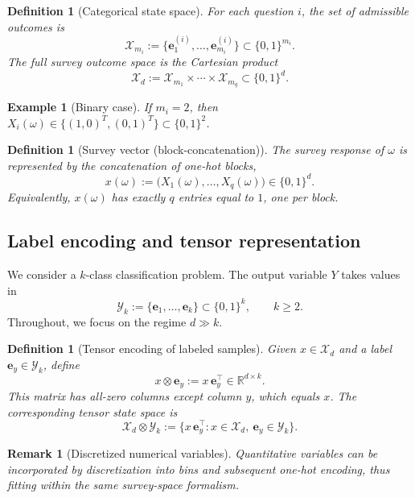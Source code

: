 \documentclass[preprint,11pt]{elsarticle}
\newtheorem{Definition}[Theorem]{Definition}
\newtheorem{Remark}[Theorem]{Remark}
\newtheorem{Example}[Theorem]{Example}
\newcommand{\R}{\mathbb{R}}
\begin{document}
\begin{Definition}[Categorical state space]
For each question $i$, the set of admissible outcomes is
\[
\mathcal X_{m_i}:=\{\mathbf e_1^{(i)},\dots,\mathbf e_{m_i}^{(i)}\}\subset\{0,1\}^{m_i}.
\]
The full survey outcome space is the Cartesian product
\[
\mathcal X_d := \mathcal X_{m_1}\times\cdots\times \mathcal X_{m_q}\subset\{0,1\}^d.
\]
\end{Definition}

\begin{Example}[Binary case]
If $m_i=2$, then $X_i(\omega)\in\{(1,0)^T,(0,1)^T\}\subset\{0,1\}^2$.
\end{Example}

\begin{Definition}[Survey vector (block-concatenation)]
The survey response of $\omega$ is represented by the concatenation of one-hot blocks,
\[
x(\omega):=\bigl(X_1(\omega),\dots,X_q(\omega)\bigr)\in\{0,1\}^d.
\]
Equivalently, $x(\omega)$ has exactly $q$ entries equal to $1$, one per block.
\end{Definition}


\subsection{Label encoding and tensor representation}
We consider a $k$-class classification problem. The output variable $Y$ takes values in
\[
\mathcal Y_k:=\{\mathbf e_1,\dots,\mathbf e_k\}\subset\{0,1\}^k,\qquad k\ge 2.
\]
Throughout, we focus on the regime $d\gg k$.

\begin{Definition}[Tensor encoding of labeled samples]
Given $x\in\mathcal X_d$ and a label $\mathbf e_y\in\mathcal Y_k$, define
\[
x\otimes \mathbf e_y := x\,\mathbf e_y^{\top}\in\R^{d\times k}.
\]
This matrix has all-zero columns except column $y$, which equals $x$.
The corresponding tensor state space is
\[
\mathcal X_d\otimes\mathcal Y_k :=
\{x\,\mathbf e_y^{\top}: x\in\mathcal X_d,\ \mathbf e_y\in\mathcal Y_k\}.
\]
\end{Definition}

\begin{Remark}[Discretized numerical variables]
Quantitative variables can be incorporated by discretization into bins and subsequent one-hot encoding,
thus fitting within the same survey-space formalism.
\end{Remark}
\end{document}
